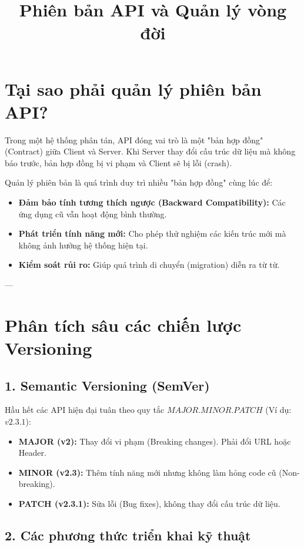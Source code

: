 \documentclass[12pt, a4paper]{article}
\title{\textbf{Phiên bản API và Quản lý vòng đời}}
\author{}
\date{}
\begin{document}
\maketitle

\section{Tại sao phải quản lý phiên bản API?}
Trong một hệ thống phân tán, API đóng vai trò là một "bản hợp đồng" (Contract) giữa Client và Server. Khi Server thay đổi cấu trúc dữ liệu mà không báo trước, bản hợp đồng bị vi phạm và Client sẽ bị lỗi (crash). 

Quản lý phiên bản là quá trình duy trì nhiều "bản hợp đồng" cùng lúc để:
\begin{itemize}
    \item \textbf{Đảm bảo tính tương thích ngược (Backward Compatibility):} Các ứng dụng cũ vẫn hoạt động bình thường.
    \item \textbf{Phát triển tính năng mới:} Cho phép thử nghiệm các kiến trúc mới mà không ảnh hưởng hệ thống hiện tại.
    \item \textbf{Kiểm soát rủi ro:} Giúp quá trình di chuyển (migration) diễn ra từ từ.
\end{itemize}

---

\section{Phân tích sâu các chiến lược Versioning}

\subsection{1. Semantic Versioning (SemVer)}
Hầu hết các API hiện đại tuân theo quy tắc $MAJOR.MINOR.PATCH$ (Ví dụ: $v2.3.1$):
\begin{itemize}
    \item \textbf{MAJOR (v2):} Thay đổi vi phạm (Breaking changes). Phải đổi URL hoặc Header.
    \item \textbf{MINOR (v2.3):} Thêm tính năng mới nhưng không làm hỏng code cũ (Non-breaking).
    \item \textbf{PATCH (v2.3.1):} Sửa lỗi (Bug fixes), không thay đổi cấu trúc dữ liệu.
\end{itemize}

\subsection{2. Các phương thức triển khai kỹ thuật}
\end{document}
